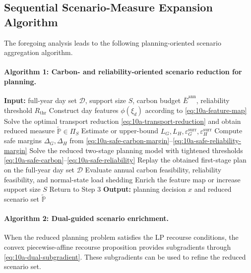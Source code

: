 \subsection{Sequential Scenario-Measure Expansion Algorithm}

The foregoing analysis leads to the following planning-oriented scenario aggregation algorithm.

\paragraph{Algorithm 1: Carbon- and reliability-oriented scenario reduction for planning.}

\begin{algorithmic}[1]
\State \textbf{Input:} full-year day set \(\mathcal{D}\), support size \(S\), carbon budget \(\bar E^{\mathrm{ann}}\), reliability threshold \(R_{\mathrm{thr}}\)
\State Construct day features \(\phi(\xi_d)\) according to \eqref{eq:10a-feature-map}
\State Solve the optimal transport reduction \eqref{eq:10a-transport-reduction} and obtain reduced measure \(\widetilde{\mathbb{P}}\in\Pi_S\)
\State Estimate or upper-bound \(L_G, L_H, \varepsilon_G^{\mathrm{surr}}, \varepsilon_H^{\mathrm{surr}}\)
\State Compute safe margins \(\Delta_G,\Delta_H\) from \eqref{eq:10a-safe-carbon-margin}--\eqref{eq:10a-safe-reliability-margin}
\State Solve the reduced two-stage planning model with tightened thresholds \eqref{eq:10a-safe-carbon}--\eqref{eq:10a-safe-reliability}
\State Replay the obtained first-stage plan on the full-year day set \(\mathcal{D}\)
\State Evaluate annual carbon feasibility, reliability feasibility, and normal-state load shedding
  \State Enrich the feature map or increase support size \(S\)
  \State Return to Step 3
\EndIf
\State \textbf{Output:} planning decision \(x\) and reduced scenario set \(\widetilde{\mathbb{P}}\)
\end{algorithmic}

\paragraph{Algorithm 2: Dual-guided scenario enrichment.}

When the reduced planning problem satisfies the LP recourse conditions, the convex piecewise-affine recourse proposition provides subgradients through \eqref{eq:10a-dual-subgradient}. These subgradients can be used to refine the reduced scenario set.

